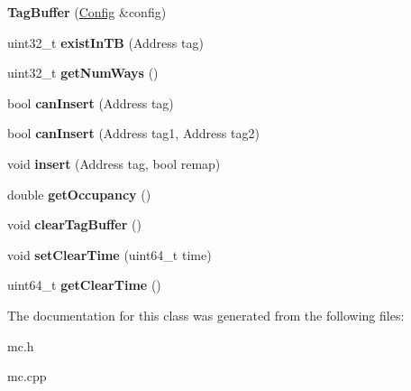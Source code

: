 \begin{DoxyCompactItemize}
\item 
\hypertarget{classTagBuffer_a39848b9d63e5e5e35dd82a7c7d47354f}{{\bfseries Tag\-Buffer} (\hyperlink{classConfig}{Config} \&config)}\label{classTagBuffer_a39848b9d63e5e5e35dd82a7c7d47354f}

\item 
\hypertarget{classTagBuffer_a699686e749c38bfee0d808504476e7f3}{uint32\-\_\-t {\bfseries exist\-In\-T\-B} (Address tag)}\label{classTagBuffer_a699686e749c38bfee0d808504476e7f3}

\item 
\hypertarget{classTagBuffer_a6f75d3b40f6e737b81b9aedcb2b651cc}{uint32\-\_\-t {\bfseries get\-Num\-Ways} ()}\label{classTagBuffer_a6f75d3b40f6e737b81b9aedcb2b651cc}

\item 
\hypertarget{classTagBuffer_a06da8be9ee55eafcc4494a0d48e4d23e}{bool {\bfseries can\-Insert} (Address tag)}\label{classTagBuffer_a06da8be9ee55eafcc4494a0d48e4d23e}

\item 
\hypertarget{classTagBuffer_a5e420f38dccfcdab4bb5288ee7733be2}{bool {\bfseries can\-Insert} (Address tag1, Address tag2)}\label{classTagBuffer_a5e420f38dccfcdab4bb5288ee7733be2}

\item 
\hypertarget{classTagBuffer_a6d3b7a3954ac01eb7db2c11ff64962d6}{void {\bfseries insert} (Address tag, bool remap)}\label{classTagBuffer_a6d3b7a3954ac01eb7db2c11ff64962d6}

\item 
\hypertarget{classTagBuffer_a98713ece5de7668b7040423d2fa555e1}{double {\bfseries get\-Occupancy} ()}\label{classTagBuffer_a98713ece5de7668b7040423d2fa555e1}

\item 
\hypertarget{classTagBuffer_a6b9cd4de15614eb838aa8f9dee650045}{void {\bfseries clear\-Tag\-Buffer} ()}\label{classTagBuffer_a6b9cd4de15614eb838aa8f9dee650045}

\item 
\hypertarget{classTagBuffer_ae5de4b2ef8899a0984127dd833c45ffd}{void {\bfseries set\-Clear\-Time} (uint64\-\_\-t time)}\label{classTagBuffer_ae5de4b2ef8899a0984127dd833c45ffd}

\item 
\hypertarget{classTagBuffer_ab9e4e3e3dcbabbcac26e7fb55dfa95ed}{uint64\-\_\-t {\bfseries get\-Clear\-Time} ()}\label{classTagBuffer_ab9e4e3e3dcbabbcac26e7fb55dfa95ed}

\end{DoxyCompactItemize}


The documentation for this class was generated from the following files\-:\begin{DoxyCompactItemize}
\item 
mc.\-h\item 
mc.\-cpp\end{DoxyCompactItemize}
